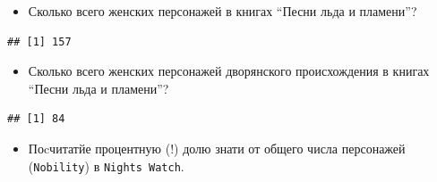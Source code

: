 \documentclass[]{book}
\newenvironment{Shaded}{\begin{snugshade}}{\end{snugshade}}
\newcommand{\DecValTok}[1]{\textcolor[rgb]{0.00,0.00,0.81}{#1}}
\newcommand{\KeywordTok}[1]{\textcolor[rgb]{0.13,0.29,0.53}{\textbf{#1}}}
\newcommand{\NormalTok}[1]{#1}
\newcommand{\OperatorTok}[1]{\textcolor[rgb]{0.81,0.36,0.00}{\textbf{#1}}}
\newcommand{\StringTok}[1]{\textcolor[rgb]{0.31,0.60,0.02}{#1}}
\providecommand{\tightlist}{%
  \setlength{\itemsep}{0pt}\setlength{\parskip}{0pt}}
\begin{document}
\begin{itemize}
\tightlist
\item
  Сколько всего женских персонажей в книгах ``Песни льда и пламени''?
\end{itemize}

\begin{Shaded}
\end{Shaded}

\begin{verbatim}
## [1] 157
\end{verbatim}

\begin{itemize}
\tightlist
\item
  Сколько всего женских персонажей дворянского происхождения в книгах ``Песни льда и пламени''?
\end{itemize}

\begin{Shaded}
\end{Shaded}

\begin{verbatim}
## [1] 84
\end{verbatim}

\begin{itemize}
\tightlist
\item
  Поcчитатйе процентную (!) долю знати от общего числа персонажей (\texttt{Nobility}) в \texttt{Night\textquotesingle{}s\ Watch}.
\end{itemize}

\begin{Shaded}
\end{Shaded}
\end{document}
